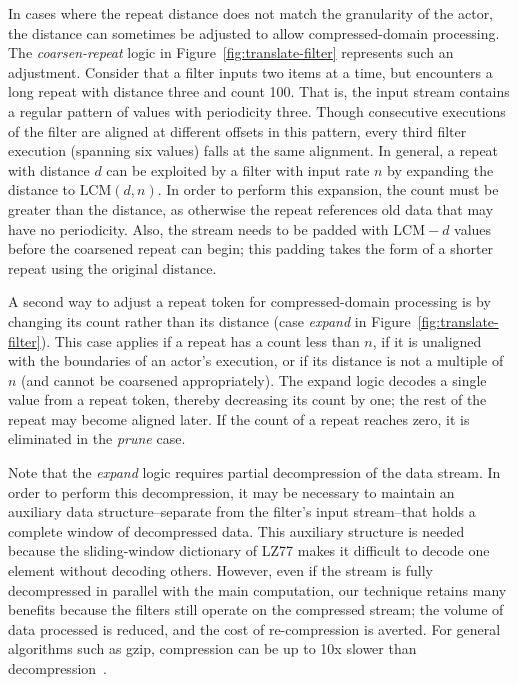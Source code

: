 In cases where the repeat distance does not match the granularity of
the actor, the distance can sometimes be adjusted to allow
compressed-domain processing.  The {\it coarsen-repeat} logic in
Figure~\ref{fig:translate-filter} represents such an adjustment.
Consider that a filter inputs two items at a time, but encounters a
long repeat with distance three and count 100.  That is, the input
stream contains a regular pattern of values with periodicity three.
Though consecutive executions of the filter are aligned at different
offsets in this pattern, every third filter execution (spanning six
values) falls at the same alignment.  In general, a repeat with
distance $d$ can be exploited by a filter with input rate $n$ by
expanding the distance to $\mbox{LCM}(d, n)$.  In order to perform
this expansion, the count must be greater than the distance, as
otherwise the repeat references old data that may have no periodicity.
Also, the stream needs to be padded with $\mbox{LCM}-d$ values before
the coarsened repeat can begin; this padding takes the form of a
shorter repeat using the original distance.

A second way to adjust a repeat token for compressed-domain processing
is by changing its count rather than its distance (case {\it expand}
in Figure~\ref{fig:translate-filter}).  This case applies if a repeat has
a count less than $n$, if it is unaligned with the boundaries of an
actor's execution, or if its distance is not a multiple of $n$ (and
cannot be coarsened appropriately).  The expand logic decodes a single
value from a repeat token, thereby decreasing its count by one; the
rest of the repeat may become aligned later.  If the count of a repeat
reaches zero, it is eliminated in the {\it prune} case.

Note that the {\it expand} logic requires partial decompression of the
data stream.  In order to perform this decompression, it may be
necessary to maintain an auxiliary data structure--separate from the
filter's input stream--that holds a complete window of decompressed
data.  This auxiliary structure is needed because the sliding-window
dictionary of LZ77 makes it difficult to decode one element without
decoding others.  However, even if the stream is fully decompressed in
parallel with the main computation, our technique retains many
benefits because the filters still operate on the compressed stream;
the volume of data processed is reduced, and the cost of
re-compression is averted.  For general algorithms such as gzip,
compression can be up to 10x slower than
decompression~\cite{ziviani00compression}.

